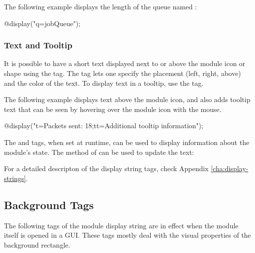 The following example displays the length of the queue named :

\begin{ned}
@display("q=jobQueue");
\end{ned}

\begin{center}
\end{center}

\subsubsection{Text and Tooltip}
\label{sec:graphics:submdule-text-and-tooltip}

It is possible to have a short text displayed next to or above the module icon
or shape using the  tag. The tag lets one specify the placement (left,
right, above) and the color of the text. To display text in a tooltip, use
the  tag.

The following example displays text above the module icon, and also adds
tooltip text that can be seen by hovering over the module icon with the
mouse.

\begin{ned}
@display("t=Packets sent: 18;tt=Additional tooltip information");
\end{ned}

\begin{center}
\end{center}

\begin{note}
  The  and  tags, when set at runtime, can be used to display
  information about the module's state. The  method
  of  can be used to update the text:
\end{note}

For a detailed descripton of the display string tags, check
Appendix \ref{cha:display-strings}.


\subsection{Background Tags}
\label{sec:graphics:background-displaystring-tags}

The following tags of the module display string are in effect when the
module itself is opened in a GUI. These tags mostly deal with the visual
properties of the background rectangle.

